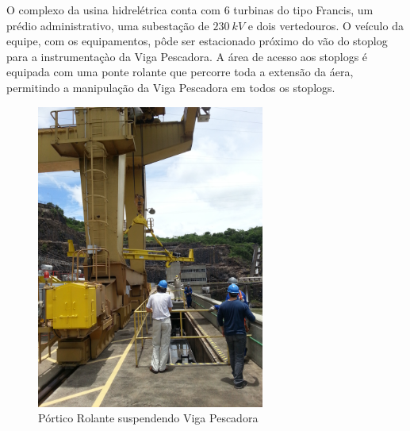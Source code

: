 O complexo da usina hidrelétrica conta com $6$ turbinas do tipo Francis, um
prédio administrativo, uma subestação de $230~kV$ e dois vertedouros. O veículo
da equipe, com os equipamentos, pôde ser estacionado próximo do vão do stoplog
para a instrumentaçào da Viga Pescadora. A área de acesso aos stoplogs é
equipada com uma ponte rolante que percorre toda a extensão da áera, permitindo
a manipulação da Viga Pescadora em todos os stoplogs. 

\begin{figure}[h!]
\centering
	\includegraphics[height=100mm, angle=270]{figs/ponte_e_viga}
	\caption{Pórtico Rolante suspendendo Viga Pescadora}
	\label{fig::ponte_e_viga}
\end{figure}
